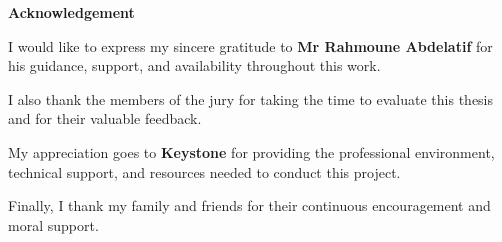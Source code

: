 \vspace*{4cm}
\begin{center}
    {\Large \bf Acknowledgement}
\end{center} \vskip 0.5cm \vskip 0.5cm

I would like to express my sincere gratitude to \textbf{Mr Rahmoune Abdelatif} for his guidance,
support, and availability throughout this work.

I also thank the members of the jury for taking the time to evaluate this thesis and for their valuable feedback.

My appreciation goes to \textbf{Keystone} for providing the professional environment, technical support,
and resources needed to conduct this project.

Finally, I thank my family and friends for their continuous encouragement and moral support.